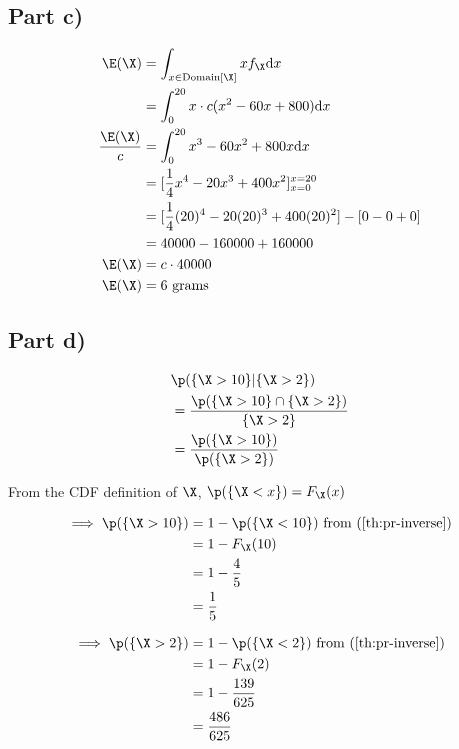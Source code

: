 \subsection*{Part c)}

\begin{align*}
\E(\X) &= \int _{x \in \mathrm{Domain}[\X]} xf_{\X}\mathrm{d}x \\
&= \int _0 ^{20} x \cdot c(x^2 - 60x + 800)\mathrm{d}x \\
\frac{\E(\X)}{c} &= \int _0 ^{20} x^3 - 60x^2 + 800x \mathrm{d}x \\
 &= [\frac{1}{4} x^4 - 20x^3 + 400x^2]^{x=20}_{x=0} \\
 &= [\frac{1}{4}(20)^4 - 20(20)^3 + 400 (20)^2] - [0 - 0 + 0] \\
 &= 40000 - 160000 + 160000 \\
\E(\X) &= c \cdot 40000 \\
\E(\X) &= 6 \text{ grams}
\end{align*}

\subsection*{Part d)}

\begin{align*}
& \p (\{ \X > 10 \} | \{ \X > 2 \}) \\
&= \frac{\p(\{ \X > 10 \} \cap  \{ \X > 2 \})}{\{ \X > 2 \}} \\
&= \frac{\p(\{ \X > 10 \})}{\p (\{ \X > 2 \})}
\end{align*}

From the CDF definition of $\X$, $\p (\{ \X < x \}) = F_{\X}(x)$

\begin{align*}
\implies \p(\{ \X > 10 \}) &= 1 - \p (\{ \X < 10 \})
\text{	from (\ref{th:pr-inverse})}
\\
&= 1 - F_{\X}(10) \\
&= 1 - \frac{4}{5} \\
&= \frac{1}{5}
\end{align*}

\begin{align*}
\implies \p(\{ \X > 2 \}) &= 1 - \p (\{ \X < 2 \})
\text{	from (\ref{th:pr-inverse})}
\\
&= 1 - F_{\X}(2) \\
&= 1 - \frac{139}{625} \\
&= \frac{486}{625}
\end{align*}

